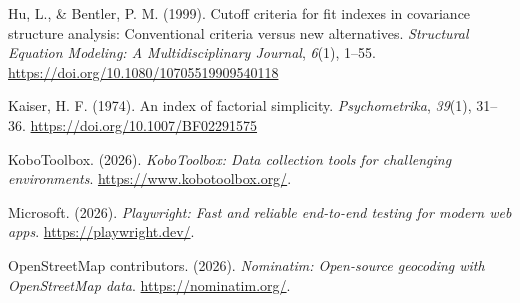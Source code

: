 \documentclass[10pt,a4paper,onecolumn]{article}
\newlength{\cslhangindent}
\newenvironment{CSLReferences}[2] %
 {\begin{list}{}{%
  \setlength{\itemindent}{0pt}
  \setlength{\leftmargin}{0pt}
  \setlength{\parsep}{0pt}
  \ifodd #1
   \setlength{\leftmargin}{\cslhangindent}
   \setlength{\itemindent}{-1\cslhangindent}
  \fi
  \setlength{\itemsep}{#2\baselineskip}}}
 {\end{list}}
\begin{document}
\begin{CSLReferences}{1}{0}
Hu, L., \& Bentler, P. M. (1999). Cutoff criteria for fit indexes in
covariance structure analysis: Conventional criteria versus new
alternatives. \emph{Structural Equation Modeling: A Multidisciplinary
Journal}, \emph{6}(1), 1--55.
\url{https://doi.org/10.1080/10705519909540118}

Kaiser, H. F. (1974). An index of factorial simplicity.
\emph{Psychometrika}, \emph{39}(1), 31--36.
\url{https://doi.org/10.1007/BF02291575}

KoboToolbox. (2026). \emph{{KoboToolbox}: Data collection tools for
challenging environments}. \url{https://www.kobotoolbox.org/}.

Microsoft. (2026). \emph{Playwright: Fast and reliable end-to-end
testing for modern web apps}. \url{https://playwright.dev/}.

OpenStreetMap contributors. (2026). \emph{Nominatim: Open-source
geocoding with {OpenStreetMap} data}. \url{https://nominatim.org/}.

\end{CSLReferences}
\end{document}
